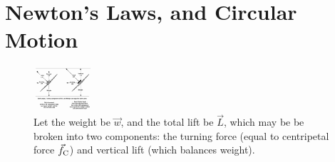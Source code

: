\documentclass[10pt]{article}
\begin{document}
\section{Newton's Laws, and Circular Motion}
\begin{figure}[ht]
\centering
\includegraphics[width=0.2\textwidth,trim=10cm 4.84cm 0cm 0.6cm,clip=true]{figures/bank.png}
\caption{\label{fig:bank} Let the weight be $\vec{w}$, and the total lift be $\vec{L}$, which may be be broken into two components: the turning force (equal to centripetal force $\vec{f}_{\rm C}$) and vertical lift (which balances weight).}
\end{figure}
\end{document}
